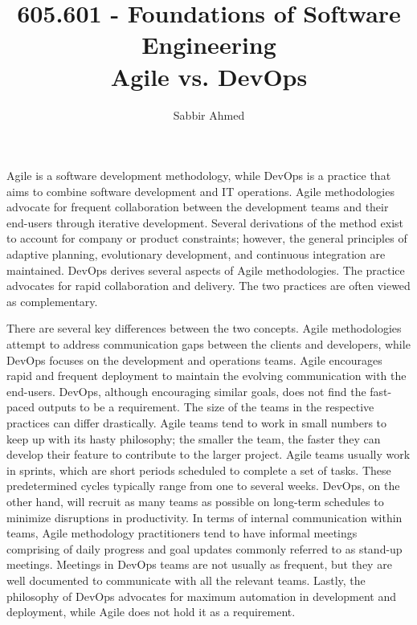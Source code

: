 \documentclass[12pt]{article}
\begin{document}
  \title{605.601 - Foundations of Software Engineering \\ Agile vs. DevOps\vspace{-0.5em}}
  \author{Sabbir Ahmed}
  \maketitle
  \vspace{-1em}




  Agile is a software development methodology, while DevOps is a practice that aims to combine software development and IT operations. Agile methodologies advocate for frequent collaboration between the development teams and their end-users through iterative development. Several derivations of the method exist to account for company or product constraints; however, the general principles of adaptive planning, evolutionary development, and continuous integration are maintained. DevOps derives several aspects of Agile methodologies. The practice advocates for rapid collaboration and delivery.\cite{BMC} The two practices are often viewed as complementary.

  There are several key differences between the two concepts. Agile methodologies attempt to address communication gaps between the clients and developers, while DevOps focuses on the development and operations teams. Agile encourages rapid and frequent deployment to maintain the evolving communication with the end-users. DevOps, although encouraging similar goals, does not find the fast-paced outputs to be a requirement. The size of the teams in the respective practices can differ drastically.\cite{guru99} Agile teams tend to work in small numbers to keep up with its hasty philosophy; the smaller the team, the faster they can develop their feature to contribute to the larger project. Agile teams usually work in sprints, which are short periods scheduled to complete a set of tasks. These predetermined cycles typically range from one to several weeks.\cite{guru99} DevOps, on the other hand, will recruit as many teams as possible on long-term schedules to minimize disruptions in productivity. In terms of internal communication within teams, Agile methodology practitioners tend to have informal meetings comprising of daily progress and goal updates commonly referred to as stand-up meetings.\cite{guru99} Meetings in DevOps teams are not usually as frequent, but they are well documented to communicate with all the relevant teams. Lastly, the philosophy of DevOps advocates for maximum automation in development and deployment, while Agile does not hold it as a requirement.
\end{document}

